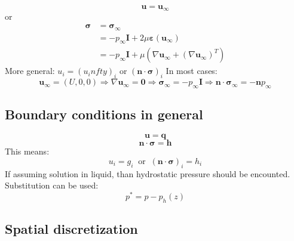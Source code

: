\documentclass[a4paper,10pt]{book}
\begin{document}
    \begin{equation}
    \mathbf{u}=\mathbf{u}_\infty
    \end{equation}
    or
    \begin{equation}
    \begin{split}
    \boldsymbol{\sigma}&=\boldsymbol{\sigma}_\infty \\
                       &=-p_\infty\mathbf{I}+2\mu\boldsymbol\varepsilon\left(\mathbf{u}_\infty\right) \\
                       &=-p_\infty\mathbf{I}+\mu\left(\nabla\mathbf{u}_\infty+\left(\nabla\mathbf{u}_\infty\right)^T\right)
    \end{split}
    \end{equation}
    More general:
    $u_i=\left(u_infty\right)_i$ or $\left(\mathbf{n}\cdot\boldsymbol{\sigma}\right)_i$
    In most cases:
    \begin{equation*}
    \mathbf{u}_\infty=(U,0,0)
    \Rightarrow\nabla\mathbf{u}_\infty=\mathbf{0}
    \Rightarrow\boldsymbol{\sigma}_\infty=-p_\infty\mathbf{I}
    \Rightarrow\mathbf{n}\cdot\boldsymbol{\sigma}_\infty=-\mathbf{n}p_\infty
    \end{equation*}

\subsection{Boundary conditions in general}

    \begin{equation}
    \mathbf{u}=\mathbf{q}
    \end{equation}
    \begin{equation}
    \mathbf{n}\cdot\boldsymbol{\sigma}=\mathbf{h}
    \end{equation}
    This means:
    \begin{equation*}
    u_i=g_i\;\;\text{or}\;\;(\mathbf{n}\cdot\boldsymbol{\sigma})_i=h_i
    \end{equation*}
    If assuming solution in liquid, than hydrostatic pressure should be encounted. \\
    Substitution can be used:
    \begin{equation}
    p^*=p-p_h(z)
    \end{equation}

\subsection{Spatial discretization}
\end{document}
